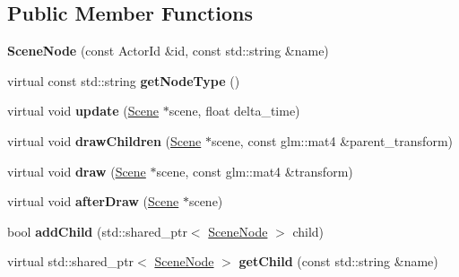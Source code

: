 \subsection*{Public Member Functions}
\begin{DoxyCompactItemize}
\item 
\mbox{\label{classTarbora_1_1SceneNode_a525d466d830ecdccc16173b3d0f9029e}} 
{\bfseries Scene\+Node} (const Actor\+Id \&id, const std\+::string \&name)
\item 
\mbox{\label{classTarbora_1_1SceneNode_a22e6aa370851aa4fe1ba409511c0bff1}} 
virtual const std\+::string {\bfseries get\+Node\+Type} ()
\item 
\mbox{\label{classTarbora_1_1SceneNode_a4b3a843a9bcfcbbefd518a7a6f018c28}} 
virtual void {\bfseries update} (\hyperlink{classTarbora_1_1Scene}{Scene} $\ast$scene, float delta\+\_\+time)
\item 
\mbox{\label{classTarbora_1_1SceneNode_aaf186e7334c6bd39b4d7c05e27760310}} 
virtual void {\bfseries draw\+Children} (\hyperlink{classTarbora_1_1Scene}{Scene} $\ast$scene, const glm\+::mat4 \&parent\+\_\+transform)
\item 
\mbox{\label{classTarbora_1_1SceneNode_a1243ef3f82739b2420753eac8bf4ac71}} 
virtual void {\bfseries draw} (\hyperlink{classTarbora_1_1Scene}{Scene} $\ast$scene, const glm\+::mat4 \&transform)
\item 
\mbox{\label{classTarbora_1_1SceneNode_af3e0f513ce4f490dc385dc00d7c61a2c}} 
virtual void {\bfseries after\+Draw} (\hyperlink{classTarbora_1_1Scene}{Scene} $\ast$scene)
\item 
\mbox{\label{classTarbora_1_1SceneNode_aca1275aac5f57efcb246bc49664c6381}} 
bool {\bfseries add\+Child} (std\+::shared\+\_\+ptr$<$ \hyperlink{classTarbora_1_1SceneNode}{Scene\+Node} $>$ child)
\item 
\mbox{\label{classTarbora_1_1SceneNode_a803d63c178c7a18e201c94abf523cb32}} 
virtual std\+::shared\+\_\+ptr$<$ \hyperlink{classTarbora_1_1SceneNode}{Scene\+Node} $>$ {\bfseries get\+Child} (const std\+::string \&name)

\end{DoxyCompactItemize}
